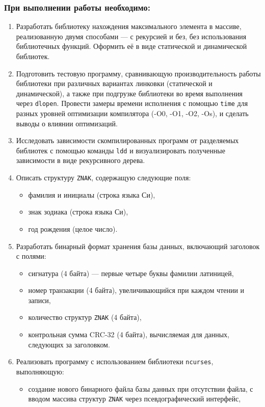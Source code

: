 \subsubsection*{При выполнении работы необходимо:}
\begin{enumerate}
\item Разработать библиотеку нахождения максимального элемента в массиве, реализованную двумя способами — с рекурсией и без, без использования библиотечных функций. Оформить её в виде статической и динамической библиотек.
\item Подготовить тестовую программу, сравнивающую производительность работы библиотеки при различных вариантах линковки (статической и динамической), а также при подгрузке библиотеки во время выполнения через \texttt{dlopen}. Провести замеры времени исполнения с помощью \texttt{time} для разных уровней оптимизации компилятора (-O0, -O1, -O2, -Os), и сделать выводы о влиянии оптимизаций.
\item Исследовать зависимости скомпилированных программ от разделяемых библиотек с помощью команды \texttt{ldd} и визуализировать полученные зависимости в виде рекурсивного дерева.
\item Описать структуру \texttt{ZNAK}, содержащую следующие поля:
  \begin{itemize}
  \item фамилия и инициалы (строка языка Си),
  \item знак зодиака (строка языка Си),
  \item год рождения (целое число).
  \end{itemize}
\item Разработать бинарный формат хранения базы данных, включающий заголовок с полями:
\begin{itemize}
\item сигнатура (4 байта) — первые четыре буквы фамилии латиницей,
\item номер транзакции (4 байта), увеличивающийся при каждом чтении и записи,
\item количество структур \texttt{ZNAK} (4 байта),
\item контрольная сумма CRC-32 (4 байта), вычисляемая для данных, следующих за заголовком.
\end{itemize}
\item Реализовать программу с использованием библиотеки \texttt{ncurses}, выполняющую:
\begin{itemize}
\item создание нового бинарного файла базы данных при отсутствии файла, с вводом массива структур \texttt{ZNAK} через псевдографический интерфейс,

\end{itemize}
\end{enumerate}
